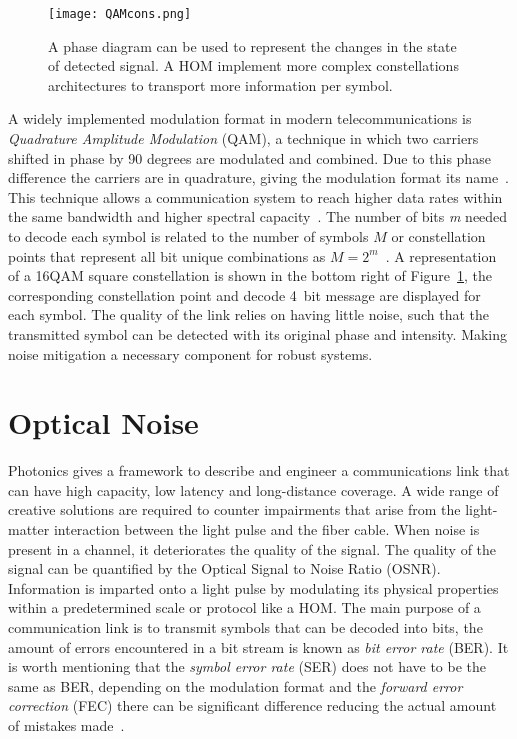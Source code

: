  \begin{figure}[h]
\centering
\texttt{[image: QAMcons.png]}
\caption{A phase diagram can be used to represent the changes in the state of detected signal. A HOM  implement more complex constellations architectures to transport more information per symbol.     }
\label{fig:QAMcons}
\end{figure}

A widely implemented modulation format in modern telecommunications is \textit{Quadrature Amplitude Modulation} (QAM), a technique in which two carriers shifted in phase by 90 degrees are modulated and combined. Due to this phase difference the carriers are in quadrature, giving the modulation format its name~\cite{benedetto1999principles}. This technique allows a communication system to reach higher data rates within the same bandwidth and higher spectral capacity~\cite{webb1994modern}. The number of bits \emph{m} needed to decode each symbol  is related to the number of symbols $M$ or constellation points that represent all bit unique combinations as $M=2^{m}$~\cite{paik1994mode}.  A representation of a 16QAM square constellation is shown in the bottom right of Figure~\ref{fig:QAMcons}, the corresponding constellation point and decode 4~bit message are displayed for each symbol. The quality of the link relies on having little noise, such that the transmitted symbol can be detected with its original phase and intensity. Making noise mitigation a necessary component for robust systems. 
 
 
  
 \section{Optical Noise}
  
Photonics gives a framework to describe and engineer a communications link that can have high capacity, low latency and long-distance coverage. A wide range of creative solutions are required to counter impairments that arise from the light-matter interaction between the light pulse and the fiber cable. When noise is present in a channel, it deteriorates the quality of the signal. The quality of the signal can be quantified  by the Optical Signal to Noise Ratio (OSNR). Information is imparted onto a light pulse by modulating its physical properties within a predetermined scale or protocol like a HOM. The main purpose of a communication link is to transmit symbols that can be decoded into bits, the amount of errors encountered in a bit stream is known as \textit{bit error rate} (BER). It is worth mentioning that the \textit{symbol error rate} (SER) does not have to be the same as BER, depending on the modulation format and the \textit{forward error correction} (FEC) there can be significant difference reducing the actual amount of mistakes made~\cite{benedetto1999principles}. 


